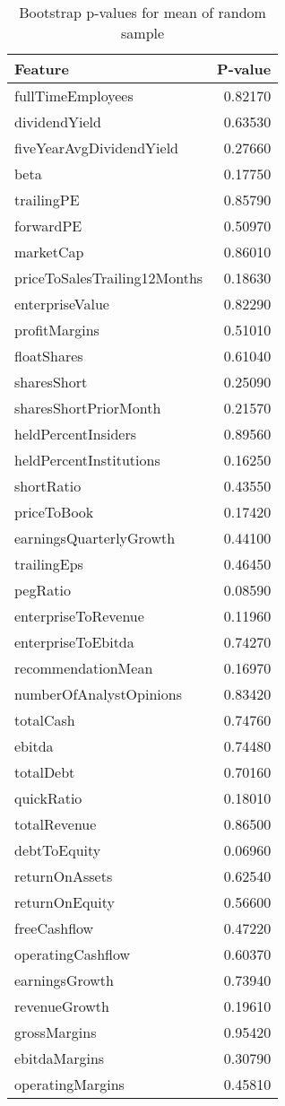 \begin{table}[H]
\centering
\small
\caption{Bootstrap p-values for mean of random sample}
\label{tab:appendix_E}
\begin{tabular}{lr}
\toprule
Feature & P-value \\
\midrule
fullTimeEmployees & 0.82170 \\
dividendYield & 0.63530 \\
fiveYearAvgDividendYield & 0.27660 \\
beta & 0.17750 \\
trailingPE & 0.85790 \\
forwardPE & 0.50970 \\
marketCap & 0.86010 \\
priceToSalesTrailing12Months & 0.18630 \\
enterpriseValue & 0.82290 \\
profitMargins & 0.51010 \\
floatShares & 0.61040 \\
sharesShort & 0.25090 \\
sharesShortPriorMonth & 0.21570 \\
heldPercentInsiders & 0.89560 \\
heldPercentInstitutions & 0.16250 \\
shortRatio & 0.43550 \\
priceToBook & 0.17420 \\
earningsQuarterlyGrowth & 0.44100 \\
trailingEps & 0.46450 \\
pegRatio & 0.08590 \\
enterpriseToRevenue & 0.11960 \\
enterpriseToEbitda & 0.74270 \\
recommendationMean & 0.16970 \\
numberOfAnalystOpinions & 0.83420 \\
totalCash & 0.74760 \\
ebitda & 0.74480 \\
totalDebt & 0.70160 \\
quickRatio & 0.18010 \\
totalRevenue & 0.86500 \\
debtToEquity & 0.06960 \\
returnOnAssets & 0.62540 \\
returnOnEquity & 0.56600 \\
freeCashflow & 0.47220 \\
operatingCashflow & 0.60370 \\
earningsGrowth & 0.73940 \\
revenueGrowth & 0.19610 \\
grossMargins & 0.95420 \\
ebitdaMargins & 0.30790 \\
operatingMargins & 0.45810 \\
\bottomrule
\end{tabular}
\end{table}
